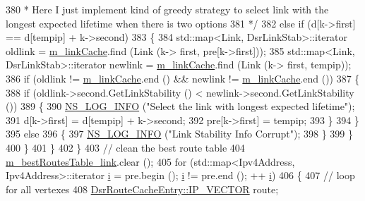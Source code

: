 \begin{DoxyCode}
380 \textcolor{comment}{               *  Here I just implement kind of greedy strategy to select link with the longest expected
       lifetime when there is two options}
381 \textcolor{comment}{               */}
382               \textcolor{keywordflow}{else} \textcolor{keywordflow}{if} (d[k->first] == d[tempip] + k->second)
383                 \{
384                   std::map<Link, DsrLinkStab>::iterator oldlink = \hyperlink{classns3_1_1dsr_1_1DsrRouteCache_a0cce90def8da7bd0953a59cf1cfd2a66}{m\_linkCache}.find (Link (k->
      first, pre[k->first]));
385                   std::map<Link, DsrLinkStab>::iterator newlink = \hyperlink{classns3_1_1dsr_1_1DsrRouteCache_a0cce90def8da7bd0953a59cf1cfd2a66}{m\_linkCache}.find (Link (k->
      first, tempip));
386                   \textcolor{keywordflow}{if} (oldlink != \hyperlink{classns3_1_1dsr_1_1DsrRouteCache_a0cce90def8da7bd0953a59cf1cfd2a66}{m\_linkCache}.end () && newlink != 
      \hyperlink{classns3_1_1dsr_1_1DsrRouteCache_a0cce90def8da7bd0953a59cf1cfd2a66}{m\_linkCache}.end ())
387                     \{
388                       \textcolor{keywordflow}{if} (oldlink->second.GetLinkStability () < newlink->second.GetLinkStability ())
389                         \{
390                           \hyperlink{group__logging_gafbd73ee2cf9f26b319f49086d8e860fb}{NS\_LOG\_INFO} (\textcolor{stringliteral}{"Select the link with longest expected lifetime"});
391                           d[k->first] = d[tempip] + k->second;
392                           pre[k->first] = tempip;
393                         \}
394                     \}
395                   \textcolor{keywordflow}{else}
396                     \{
397                       \hyperlink{group__logging_gafbd73ee2cf9f26b319f49086d8e860fb}{NS\_LOG\_INFO} (\textcolor{stringliteral}{"Link Stability Info Corrupt"});
398                     \}
399                 \}
400             \}
401         \}
402     \}
403   \textcolor{comment}{// clean the best route table}
404   \hyperlink{classns3_1_1dsr_1_1DsrRouteCache_aeff05d869cb32e13605d4792a0a0d841}{m\_bestRoutesTable\_link}.clear ();
405   \textcolor{keywordflow}{for} (std::map<Ipv4Address, Ipv4Address>::iterator \hyperlink{bernuolliDistribution_8m_a6f6ccfcf58b31cb6412107d9d5281426}{i} = pre.begin (); \hyperlink{bernuolliDistribution_8m_a6f6ccfcf58b31cb6412107d9d5281426}{i} != pre.end (); ++
      \hyperlink{bernuolliDistribution_8m_a6f6ccfcf58b31cb6412107d9d5281426}{i})
406     \{
407       \textcolor{comment}{// loop for all vertexes}
408       \hyperlink{classns3_1_1dsr_1_1DsrRouteCacheEntry_ab834177006bdbfd2e3fa607c2a88cbdf}{DsrRouteCacheEntry::IP\_VECTOR} route;

\end{DoxyCode}
